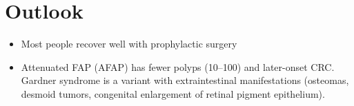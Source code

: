 \section{Outlook}
\begin{itemize}[noitemsep]
  \item Most people recover well with prophylactic surgery
  \item Attenuated FAP (AFAP) has fewer polyps (10--100) and later-onset CRC. Gardner syndrome is a variant with extraintestinal manifestations (osteomas, desmoid tumors, congenital enlargement of retinal pigment epithelium).
\end{itemize}
